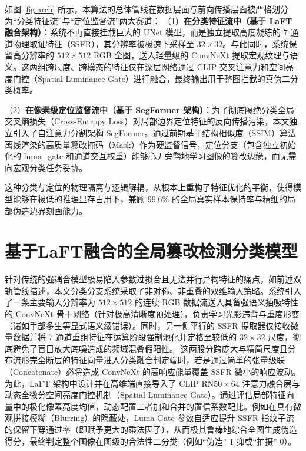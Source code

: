 \documentclass[UTF8, a4paper, 12pt]{ctexrep}
\begin{document}
如图 \ref{fig:arch} 所示，本算法的总体管线在数据层面与前向传播层面被严格划分为“分类特征流”与“定位监督流”两大赛道：
（1）\textbf{在分类特征流中（基于 LaFT 融合架构）}：系统不再直接挂载巨大的 UNet 模型，而是独立提取高度凝练的 $7$ 通道物理取证特征（SSFR），其分辨率被极速下采样至 $32 \times 32$。与此同时，系统保留高分辨率的 $512 \times 512$ RGB 全图，送入轻量级的 ConvNeXt 提取宏观纹理与语义。这两组跨尺度、跨模态的特征仅在深层网络通过 CLIP 交叉注意力和空间亮度门控（Spatial Luminance Gate）进行融合，最终输出用于整图拦截的真伪二分类概率。

（2）\textbf{在像素级定位监督流中（基于 SegFormer 架构）}：为了彻底隔绝分类全局交叉熵损失（Cross-Entropy Loss）对局部边界定位特征的反向传播污染，本文独立引入了自注意力分割架构 SegFormer。通过前期基于结构相似度（SSIM）算法离线渲染的高质量篡改掩码（Mask）作为硬监督信号，定位分支（包含独立初始化的 luma\_gate 和通道交互权重）能够心无旁骛地学习图像的篡改边缘，而无需向宏观分类任务妥协。



这种分类与定位的物理隔离与逻辑解耦，从根本上重构了特征优化的平衡，使得模型能够在极低的推理显存占用下，兼顾 $99.6\%$ 的全局真实样本保持率与精细的局部伪造边界刻画能力。

\section{基于LaFT融合的全局篡改检测分类模型}
针对传统的强耦合模型极易陷入参数过拟合且无法并行异构特征的痛点，如前述双轨管线描述，本文分类分支系统采取了非对称、非重叠的双维输入策略。系统引入了一条主要输入分辨率为 $512 \times 512$ 的连续 RGB 数据流送入具备强语义抽吸特性的 ConvNeXt 骨干网络（针对极高清晰度预处理），负责学习光影违背与重度形变（诸如手部多生等显式语义级错误）。同时，另一侧平行的 SSFR 提取器仅接收微量数据并将 $7$ 通道重组特征在运算阶段强制池化并定格至较低的 $32 \times 32$ 尺度，彻底避免了盲目放大底噪造成的频域混叠假阳性。
这两股分跨庞大与精简尺度且分布流形完全断层的特征向量进入分类融合判定端时，若是通过简单的张量级联（Concatenate）必将造成 ConvNeXt 的高响应能量覆盖 SSFR 微小的响应波动。为此，LaFT 架构中设计并在高维端直接导入了 CLIP $\text{RN50}\times 64$ 注意力融合层与动态全微分空间亮度门控机制（Spatial Luminance Gate）。通过评估局部特征向量中的极化像素亮度均值，动态配置二者加和合并的置信系数配比。例如在具有微观拼接模糊（Blurring）的隐蔽处，Luma Gate 参数自适应提升 SSFR 指纹子流的保留下穿通过率（即赋予更大的乘法因子），从而极其鲁棒地综合全图生成伪造得分，最终判定整个图像在图级的合法性二分类（例如“伪造” $1$ 抑或“拍摄” $0$）。
\end{document}
